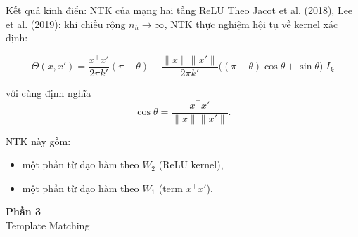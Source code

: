 \begin{frame}{Kết quả kinh điển: NTK của mạng hai tầng ReLU}
Theo Jacot et al. (2018), Lee et al. (2019):
khi chiều rộng $n_h \to \infty$, NTK thực nghiệm hội tụ về
kernel xác định:

\[
\Theta(x,x')
=
\frac{x^\top x'}{2\pi k'}(\pi - \theta)
+
\frac{\|x\|\|x'\|}{2\pi k'}
\Big(
(\pi - \theta)\cos\theta + \sin\theta
\Big)
\; I_k
\]

với cùng định nghĩa
\[
\cos\theta = \frac{x^\top x'}{\|x\|\|x'\|}.
\]

\vspace{0.2cm}
NTK này gồm:
\begin{itemize}
    \item một phần từ đạo hàm theo $W_2$ (ReLU kernel),
    \item một phần từ đạo hàm theo $W_1$ (term $x^\top x'$).
\end{itemize}
\end{frame}

\begin{frame}{}
  \centering
  \vfill
  {\Huge \textbf{Phần 3}}\\[0.5cm]
  {\Large Template Matching}
  \vfill
\end{frame}
